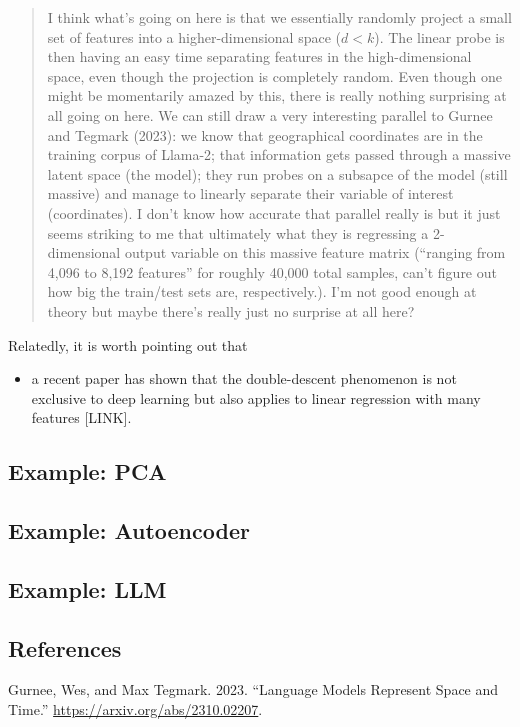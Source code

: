 \documentclass[
  letterpaper,
  DIV=11,
  numbers=noendperiod]{scrartcl}
\providecommand{\tightlist}{%
  \setlength{\itemsep}{0pt}\setlength{\parskip}{0pt}}\usepackage{longtable,booktabs,array}
\newlength{\cslhangindent}
\newlength{\cslentryspacingunit} %
\newenvironment{CSLReferences}[2] %
 {%
  \setlength{\parindent}{0pt}
  \ifodd #1
  \let\oldpar\par
  \def\par{\hangindent=\cslhangindent\oldpar}
  \fi
  \setlength{\parskip}{#2\cslentryspacingunit}
 }%
 {}
\begin{document}
\begin{quote}
I think what's going on here is that we essentially randomly project a
small set of features into a higher-dimensional space (\(d < k\)). The
linear probe is then having an easy time separating features in the
high-dimensional space, even though the projection is completely random.
Even though one might be momentarily amazed by this, there is really
nothing surprising at all going on here. We can still draw a very
interesting parallel to Gurnee and Tegmark (2023): we know that
geographical coordinates are in the training corpus of Llama-2; that
information gets passed through a massive latent space (the model); they
run probes on a subsapce of the model (still massive) and manage to
linearly separate their variable of interest (coordinates). I don't know
how accurate that parallel really is but it just seems striking to me
that ultimately what they is regressing a 2-dimensional output variable
on this massive feature matrix (``ranging from 4,096 to 8,192 features''
for roughly 40,000 total samples, can't figure out how big the
train/test sets are, respectively.). I'm not good enough at theory but
maybe there's really just no surprise at all here?
\end{quote}

Relatedly, it is worth pointing out that

\begin{itemize}
\tightlist
\item
  a recent paper has shown that the double-descent phenomenon is not
  exclusive to deep learning but also applies to linear regression with
  many features {[}LINK{]}.
\end{itemize}

\hypertarget{example-pca}{%
\subsection{Example: PCA}\label{example-pca}}

\hypertarget{example-autoencoder}{%
\subsection{Example: Autoencoder}\label{example-autoencoder}}

\hypertarget{example-llm}{%
\subsection{Example: LLM}\label{example-llm}}

\hypertarget{references}{%
\subsection*{References}\label{references}}

\hypertarget{refs}{}
\begin{CSLReferences}{1}{0}
\leavevmode{}%
Gurnee, Wes, and Max Tegmark. 2023. {``Language Models Represent Space
and Time.''} \url{https://arxiv.org/abs/2310.02207}.

\end{CSLReferences}
\end{document}
